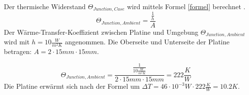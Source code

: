 \documentclass[10pt,a4paper,oneside,abstracton]{scrartcl}
\begin{document}
\begin{multicols}{2}

\noindent
Der thermische Widerstand $\Theta_{Junction, Case}$  wird mittels Formel \ref*{formel} berechnet . 
\begin{equation}
	\Theta_{Junction, Ambient} = \frac{\frac{1}{h}}{A}
	\label{formel}
\end{equation}
Der Wärme-Transfer-Koeffizient zwischen Platine und Umgebung $\Theta_{Junction, Ambient}$ wird mit $ h = 10 \frac{W}{m^2K}$ angenommen.\newline
Die Oberseite und Unterseite der Platine betragen: \newline
$A = 2\cdot 15mm \cdot 15mm$. 

\begin{equation}
	\Theta_{Junction, Ambient} = \frac{\frac{1}{10 \frac{W}{m^2K}}}{ 2\cdot 15mm \cdot 15mm} = 222 \frac{K}{W}
	\label{formel}
\end{equation}
Die Platine erwärmt sich nach der Formel um \newline
$\Delta T = 46 \cdot 10^{-3} W \cdot 222 \frac{K }{W} = 10.2 K  $.


\end{multicols}
\end{document}
